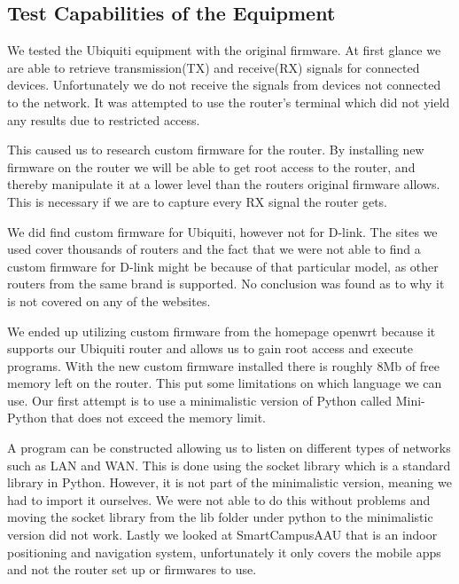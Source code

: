 \subsection*{Test Capabilities of the Equipment}
We tested the Ubiquiti equipment with the original firmware. At first glance we are able to retrieve transmission(TX) and receive(RX) signals for connected devices. Unfortunately we do not receive the signals from devices not connected to the network. It was attempted to use the router's terminal which did not yield any results due to restricted access.

This caused us to research custom firmware for the router. By installing new firmware on the router we will be able to get root access to the router, and thereby manipulate it at a lower level than the routers original firmware allows. This is necessary if we are to capture every RX signal the router gets.

We did find custom firmware for Ubiquiti, however not for D-link. The sites we used cover thousands of routers and the fact that we were not able to find a custom firmware for D-link might be because of that particular model, as other routers from the same brand is supported. No conclusion was found as to why it is not covered on any of the websites\cite{firmware_1}\cite{firmware_2}\cite{firmware_3}\cite{firmware_4}\cite{firmware_5}\cite{firmware_6}.

We ended up utilizing custom firmware from the homepage openwrt because it supports our Ubiquiti router and allows us to gain root access and execute programs. With the new custom firmware installed there is roughly 8Mb of free memory left on the router. This put some limitations on which language we can use. Our first attempt is to use a minimalistic version of Python called Mini-Python that does not exceed the memory limit.

A program can be constructed allowing us to listen on different types of networks such as LAN and WAN. This is done using the socket library which is a standard library in Python. However, it is not part of the minimalistic version, meaning we had to import it ourselves. We were not able to do this without problems and moving the socket library from the lib folder under python to the minimalistic version did not work. Lastly we looked at SmartCampusAAU that is an indoor positioning and navigation system, unfortunately it only covers the mobile apps and not the router set up or firmwares to use.

